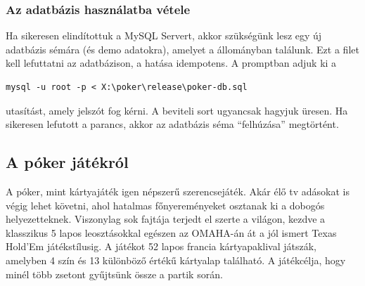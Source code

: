 \subsubsection{Az adatbázis használatba vétele}
Ha sikeresen elindítottuk a MySQL Servert, akkor szükségünk lesz egy új adatbázis sémára (és demo adatokra), amelyet a  állományban találunk. Ezt a filet kell lefuttatni az adatbázison, a hatása idempotens. A promptban adjuk ki a
 \begin{verbatim}
mysql -u root -p < X:\poker\release\poker-db.sql
\end{verbatim}
utasítást, amely jelszót fog kérni. A beviteli sort ugyancsak hagyjuk üresen. Ha sikeresen lefutott a parancs, akkor az adatbázis séma ``felhúzása'' megtörtént.

\subsection{A póker játékról}
A póker, mint kártyajáték igen népszerű szerencsejáték. Akár élő tv adásokat is végig lehet követni, ahol hatalmas főnyereményeket osztanak ki a dobogós helyezetteknek. Viszonylag sok fajtája terjedt el szerte a világon, kezdve a klasszikus 5 lapos leosztásokkal egészen az OMAHA-án át a jól ismert Texas Hold'Em játékstílusig. A játékot 52 lapos francia kártyapaklival játszák, amelyben 4 szín és 13 különböző értékű kártyalap található. A játékcélja, hogy minél több zsetont gyűjtsünk össze a partik során.

